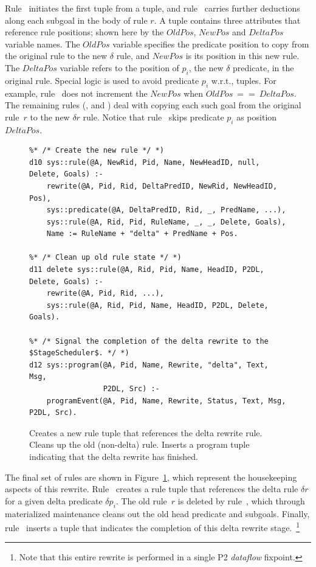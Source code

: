 Rule~ initiates the first  tuple from a 
tuple, and rule~ carries further  deductions along each
subgoal in the body of rule $r$.  A  tuple contains three
attributes that reference rule positions; shown here by the $OldPos$, $NewPos$
and $DeltaPos$ variable names.  The $OldPos$ variable specifies the predicate
position to copy from the original rule to the new $\delta$ rule, and $NewPos$
is its position in this new rule.  The $DeltaPos$ variable refers to the
position of $p_i$, the new $\delta$ predicate, in the original rule.  Special
logic is used to avoid predicate $p_i$ w.r.t.,  tuples.  For
example, rule~ does not increment the $NewPos$ when $OldPos\ ==\
DeltaPos$.  The remaining rules (,  and ) deal with
copying each such goal from the original rule~$r$ to the new $\delta r$ rule.
Notice that rule~\ol{d7} skips predicate $p_i$ as position $DeltaPos$.

\begin{figure}[!t]
\ssp
\centering
\begin{lstlisting}
%* /* Create the new rule */ *)
d10 sys::rule(@A, NewRid, Pid, Name, NewHeadID, null, Delete, Goals) :-
    rewrite(@A, Pid, Rid, DeltaPredID, NewRid, NewHeadID, Pos),
    sys::predicate(@A, DeltaPredID, Rid, _, PredName, ...),
    sys::rule(@A, Rid, Pid, RuleName, _, _, Delete, Goals),
    Name := RuleName + "delta" + PredName + Pos.

%* /* Clean up old rule state */ *)
d11 delete sys::rule(@A, Rid, Pid, Name, HeadID, P2DL, Delete, Goals) :-
    rewrite(@A, Pid, Rid, ...),
    sys::rule(@A, Rid, Pid, Name, HeadID, P2DL, Delete, Goals).
  
%* /* Signal the completion of the delta rewrite to the $StageScheduler$. */ *)
d12 sys::program(@A, Pid, Name, Rewrite, "delta", Text, Msg, 
                 P2DL, Src) :-
    programEvent(@A, Pid, Name, Rewrite, Status, Text, Msg, P2DL, Src).
\end{lstlisting}
\caption{\label{ch:evita:fig:delta4}Creates a new rule tuple that references the delta 
rewrite rule. Cleans up the old (non-delta) rule. Inserts a program tuple indicating
that the delta rewrite has finished. }
\end{figure}

The final set of rules are shown in Figure~\ref{ch:evita:fig:delta4}, which
represent the housekeeping aspects of this rewrite.  Rule~\ol{d10} creates a
rule tuple that references the delta rule $\delta r$ for a given delta
predicate $\delta p_i$.  The old rule~$r$ is deleted by rule~\ol{d11}, which
through materialized maintenance cleans out the old head predicate and
subgoals.  Finally, rule~\ol{d12} inserts a \ol{program} tuple that indicates
the completion of this delta rewrite stage.~\footnote{Note that this entire 
rewrite is performed in a single P2 {\em dataflow} fixpoint.}

